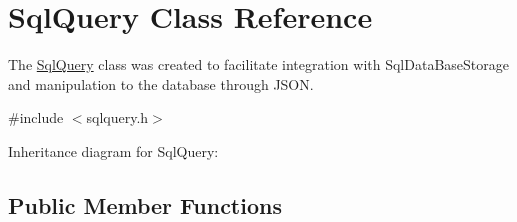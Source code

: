 \hypertarget{class_sql_query}{}\section{Sql\+Query Class Reference}
\label{class_sql_query}


The \hyperlink{class_sql_query}{Sql\+Query} class was created to facilitate integration with Sql\+Data\+Base\+Storage and manipulation to the database through J\+S\+ON.  




{\ttfamily \#include $<$sqlquery.\+h$>$}



Inheritance diagram for Sql\+Query\+:
\subsection*{Public Member Functions}
